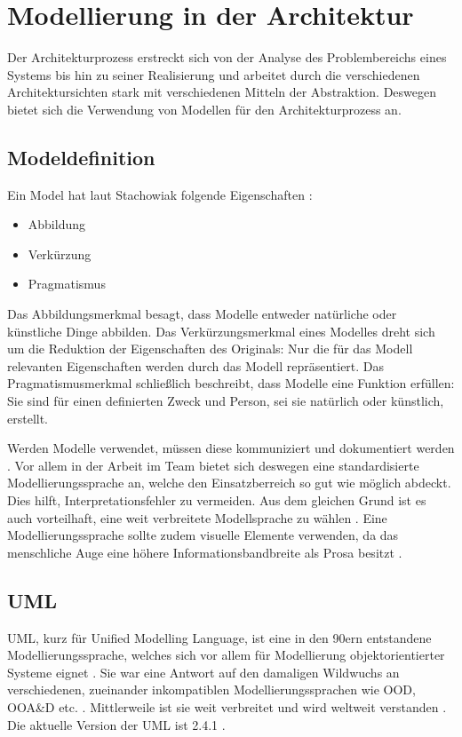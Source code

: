 \chapter{Modellierung in der Architektur}
Der Architekturprozess \glqq erstreckt sich von der Analyse des Problembereichs eines Systems bis hin zu seiner Realisierung\grqq \cite[S. 10]{softarch} und arbeitet durch die verschiedenen Architektursichten stark mit verschiedenen Mitteln der Abstraktion. Deswegen bietet sich die Verwendung von Modellen für den Architekturprozess an.

\section{Modeldefinition}
Ein Model hat laut Stachowiak folgende Eigenschaften \cite[S. 131-133]{modell}:

\begin{itemize}
  \item Abbildung
  \item Verkürzung
  \item Pragmatismus
\end{itemize}

Das Abbildungsmerkmal besagt, dass Modelle entweder natürliche oder künstliche Dinge abbilden. Das Verkürzungsmerkmal eines Modelles dreht sich um die Reduktion der Eigenschaften des Originals: Nur die für das Modell relevanten Eigenschaften werden durch das Modell repräsentiert. Das Pragmatismusmerkmal schließlich beschreibt, dass Modelle eine Funktion erfüllen: Sie sind für einen definierten Zweck und Person, sei sie natürlich oder künstlich, erstellt. \cite[S. 131-133]{modell}

Werden Modelle verwendet, müssen diese kommuniziert und dokumentiert werden \cite[S. 12]{reqanalysis}. Vor allem in der Arbeit im Team bietet sich deswegen eine standardisierte Modellierungssprache an, welche den Einsatzberreich so gut wie möglich abdeckt. Dies hilft, Interpretationsfehler zu vermeiden. Aus dem gleichen Grund ist es auch vorteilhaft, eine weit verbreitete Modellsprache zu wählen \cite[S. 139]{effektiv}. Eine Modellierungssprache sollte zudem visuelle Elemente verwenden, da das menschliche Auge eine höhere Informationsbandbreite als Prosa besitzt \cite[S. 12]{reqanalysis}.

\section{UML}
UML, kurz für Unified Modelling Language, ist eine in den 90ern entstandene Modellierungssprache, welches sich vor allem für Modellierung objektorientierter Systeme eignet \cite[S. 145]{basiswissen}. Sie war eine Antwort auf den damaligen Wildwuchs an verschiedenen, zueinander inkompatiblen Modellierungssprachen wie OOD, OOA\&D etc. \cite[S. 5]{glasklar}. Mittlerweile ist sie weit verbreitet und wird weltweit verstanden \cite[S. 138]{effektiv}. Die aktuelle Version der UML ist 2.4.1 \cite{omg}.


